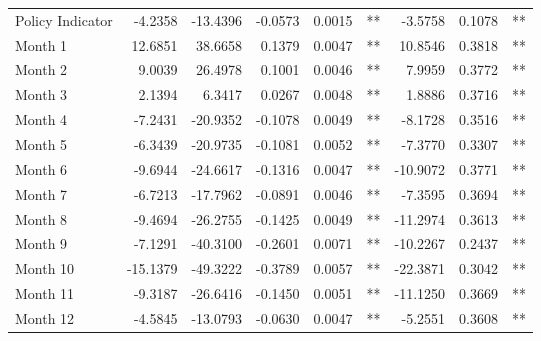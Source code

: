 \begin{table}
\begin{tabular}{l r r r r l r r l}
Policy Indicator          &  -4.2358        &  -13.4396       &  -0.0573        &  0.0015       &   **       &  -3.5758        &  0.1078       &   **       \\ 
Month 1                         &  12.6851        &  38.6658       &  0.1379        &  0.0047       &   **       &  10.8546        &  0.3818       &   **       \\ 
Month 2                         &  9.0039        &  26.4978       &  0.1001        &  0.0046       &   **       &  7.9959        &  0.3772       &   **       \\ 
Month 3                         &  2.1394        &  6.3417       &  0.0267        &  0.0048       &   **       &  1.8886        &  0.3716       &   **       \\ 
Month 4                         &  -7.2431        &  -20.9352       &  -0.1078        &  0.0049       &   **       &  -8.1728        &  0.3516       &   **       \\ 
Month 5                         &  -6.3439        &  -20.9735       &  -0.1081        &  0.0052       &   **       &  -7.3770        &  0.3307       &   **       \\ 
Month 6                         &  -9.6944        &  -24.6617       &  -0.1316        &  0.0047       &   **       &  -10.9072        &  0.3771       &   **       \\ 
Month 7                         &  -6.7213        &  -17.7962       &  -0.0891        &  0.0046       &   **       &  -7.3595        &  0.3694       &   **       \\ 
Month 8                         &  -9.4694        &  -26.2755       &  -0.1425        &  0.0049       &   **       &  -11.2974        &  0.3613       &   **       \\ 
Month 9                         &  -7.1291        &  -40.3100       &  -0.2601        &  0.0071       &   **       &  -10.2267        &  0.2437       &   **       \\ 
Month 10                        &  -15.1379        &  -49.3222       &  -0.3789        &  0.0057       &   **       &  -22.3871        &  0.3042       &   **       \\ 
Month 11                        &  -9.3187        &  -26.6416       &  -0.1450        &  0.0051       &   **       &  -11.1250        &  0.3669       &   **       \\ 
Month 12                        &  -4.5845        &  -13.0793       &  -0.0630        &  0.0047       &   **       &  -5.2551        &  0.3608       &   **       \\ 


\end{tabular}
\end{table}

